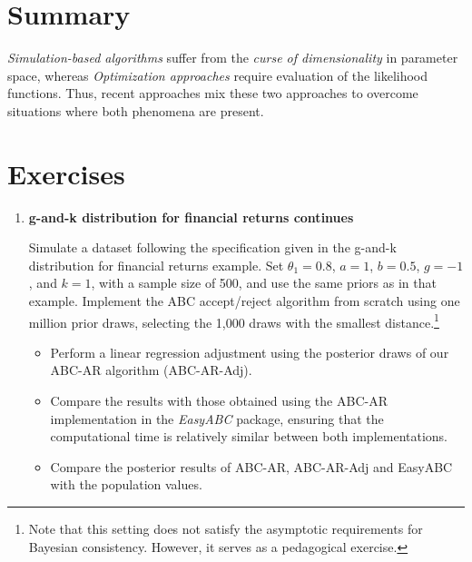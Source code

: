 \section{Summary}\label{sec15_3}
\textit{Simulation-based algorithms} suffer from the \textit{curse of dimensionality} in parameter space, whereas \textit{Optimization approaches} require evaluation of the likelihood functions. Thus, recent approaches mix these two approaches to overcome situations where both phenomena are present.

\section{Exercises}\label{sec15_4}

\begin{enumerate}
	\item \textbf{g-and-k distribution for financial returns continues}
	
	Simulate a dataset following the specification given in the g-and-k distribution for financial returns example. Set $\theta_1 = 0.8$, $a = 1$, $b = 0.5$, $g = -1$, and $k = 1$, with a sample size of 500, and use the same priors as in that example. Implement the ABC accept/reject algorithm from scratch using one million prior draws, selecting the 1,000 draws with the smallest distance.\footnote{Note that this setting does not satisfy the asymptotic requirements for Bayesian consistency. However, it serves as a pedagogical exercise.}
	
	\begin{itemize}
		\item Perform a linear regression adjustment using the posterior draws of our ABC-AR algorithm (ABC-AR-Adj).
		\item Compare the results with those obtained using the ABC-AR implementation in the \textit{EasyABC} package, ensuring that the computational time is relatively similar between both implementations.
		\item Compare the posterior results of ABC-AR, ABC-AR-Adj and EasyABC with the population values.
	\end{itemize}
	

\end{enumerate}
